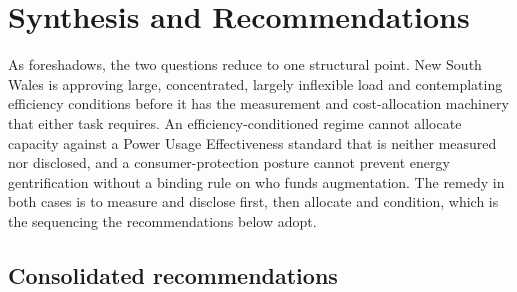 \chapter{Synthesis and Recommendations}
\label{ch:supp:synthesis}

As  foreshadows, the two questions reduce to one structural point. New South Wales is approving large, concentrated, largely inflexible load and contemplating efficiency conditions before it has the measurement and cost-allocation machinery that either task requires. An efficiency-conditioned regime cannot allocate capacity against a Power Usage Effectiveness standard that is neither measured nor disclosed, and a consumer-protection posture cannot prevent energy gentrification without a binding rule on who funds augmentation. The remedy in both cases is to measure and disclose first, then allocate and condition, which is the sequencing the recommendations below adopt.

\section{Consolidated recommendations}
\label{sec:supp:syn:recs}

